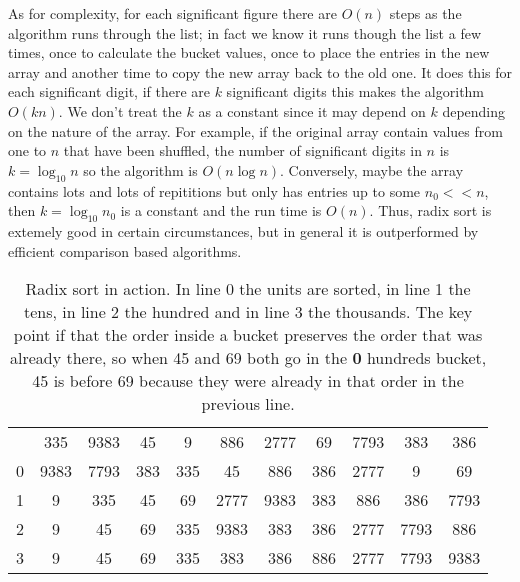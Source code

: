 \documentclass[11pt,a4paper]{scrartcl}
\begin{document}
As for complexity, for each significant figure there are $O(n)$ steps
as the algorithm runs through the list; in fact we know it runs though
the list a few times, once to calculate the bucket values, once to
place the entries in the new array and another time to copy the new
array back to the old one. It does this for each significant digit, if
there are $k$ significant digits this makes the algorithm $O(kn)$. We
don't treat the $k$ as a constant since it may depend on $k$ depending
on the nature of the array. For example, if the original array contain
values from one to $n$ that have been shuffled, the number of
significant digits in $n$ is $k=\log_{10}n$ so the algorithm is
$O(n\log{n})$. Conversely, maybe the array contains lots and lots of
repititions but only has entries up to some $n_0<<n$, then
$k=\log_{10}n_0$ is a constant and the run time is $O(n)$. Thus, radix
sort is extemely good in certain circumstances, but in general it is
outperformed by efficient comparison based algorithms.

\begin{table}
\begin{tabular}{c|cccccccccc}
&335&9383 &45 &9&886&2777&69&7793&383&386\\
0&9383&7793&383&335&45&886&386&2777&9&69\\
1&9&335&45&69&2777&9383&383&886&386&7793\\
2&9&45&69&335&9383&383&386&2777&7793&886\\
3&9&45&69&335&383&386&886&2777&7793&9383
\end{tabular}
\caption{Radix sort in action. In line 0 the units are sorted, in line
  1 the tens, in line 2 the hundred and in line 3 the thousands. The
  key point if that the order inside a bucket preserves the order that
  was already there, so when 45 and 69 both go in the {\bf 0} hundreds
  bucket, 45 is before 69 because they were already in that order in
  the previous line.\label{table_radix}}
\end{table}
\end{document}
